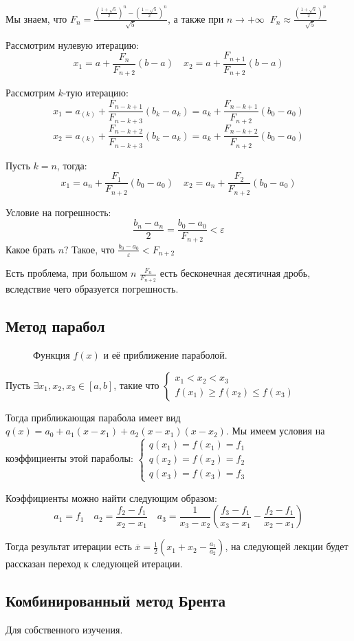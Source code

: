 \documentclass[12pt, a4paper, oneside]{book}
\begin{document}
Мы знаем, что \(F_n = \frac{\left( \frac{1 + \sqrt{5}}{2} \right)^n - \left( \frac{1 - \sqrt{5}}{2} \right)^n}{\sqrt{5}} \), а также при \(n \to +\infty\ \) \(F_n \approx \frac{\left( \frac{1 + \sqrt{5}}{2} \right)^n}{\sqrt{5}}\)

Рассмотрим нулевую итерацию:
\[x_1 = a + \frac{F_n}{F_{n + 2}} (b - a) \quad x_2 = a + \frac{F_{n+1}}{F_{n + 2}} (b - a)\]

Рассмотрим \(k\)-тую итерацию:
\[x_1 = a_{(k)} + \frac{F_{n - k + 1}}{F_{n - k + 3}} (b_k - a_k) = a_k + \frac{F_{n - k + 1}}{F_{n + 2}} (b_0 - a_0)\]
\[x_2 = a_{(k)} + \frac{F_{n - k + 2}}{F_{n - k + 3}} (b_k - a_k) = a_k + \frac{F_{n - k + 2}}{F_{n + 2}} (b_0 - a_0)\]

Пусть \(k = n\), тогда:
\[x_1 = a_n + \frac{F_1}{F_{n + 2}} (b_0 - a_0) \quad x_2 = a_n + \frac{F_2}{F_{n + 2}} (b_0 - a_0)\]

Условие на погрешность:
\[\frac{b_n - a_n}{2} = \frac{b_0 - a_0}{F_{n + 2}} < \varepsilon\]
Какое брать \(n?\) Такое, что \(\frac{b_0 - a_0}{\varepsilon} < F_{n + 2}\)

Есть проблема, при большом \(n\) \(\frac{F_n}{F_{n + 2}}\) есть бесконечная десятичная дробь, вследствие чего образуется погрешность.

\subsection{Метод парабол}

\begin{figure}[h]
    \centering
    
    \caption{Функция \(f(x)\) и её приближение параболой.}
\end{figure}

Пусть \(\exists x_1, x_2, x_3\in[a, b]\), такие что \(\begin{cases}
    x_1 < x_2 < x_3 \\
    f(x_1) \geq f(x_2) \leq f(x_3)
\end{cases}\)

Тогда приближающая парабола имеет вид \(q(x) = a_0 + a_1(x - x_1) + a_2(x - x_1)(x - x_2)\). Мы имеем условия на коэффициенты этой параболы: \(\begin{cases}
    q(x_1) = f(x_1) = f_1 \\
    q(x_2) = f(x_2) = f_2 \\
    q(x_3) = f(x_3) = f_3
\end{cases}\)

Коэффициенты можно найти следующим образом:
\[a_1 = f_1 \quad a_2 = \frac{f_2 - f_1}{x_2 - x_1} \quad a_3 = \frac{1}{x_3 - x_2} \left( \frac{f_3 - f_1}{x_3 - x_1} - \frac{f_2 - f_1}{x_2 - x_1} \right) \]

Тогда результат итерации есть \(\overline x = \frac{1}{2} \left( x_1 + x_2 - \frac{a_1}{a_2} \right)\), на следующей лекции будет рассказан переход к следующей итерации.

\subsection{Комбинированный метод Брента}

Для собственного изучения.
\end{document}
